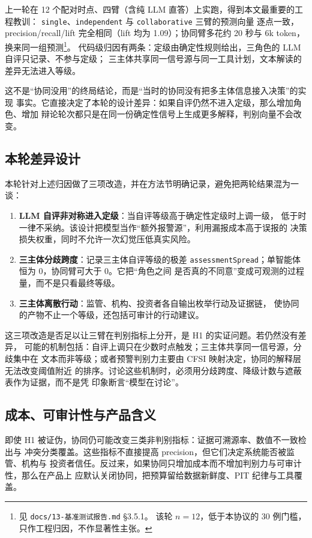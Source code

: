 \documentclass[UTF8,fontset=fandol,11pt,a4paper]{ctexart}
\begin{document}
上一轮在 12 个配对时点、四臂（含纯 LLM 直答）上实跑，得到本文最重要的工程教训：
\texttt{single}、\texttt{independent} 与 \texttt{collaborative} 三臂的预测向量
逐点一致，precision/recall/lift 完全相同（lift 均为 1.09）；协同臂多花约 20 秒与
6k token，换来同一组预测\footnote{见 \texttt{docs/13-基准测试报告.md} §3.5.1。
该轮 $n=12$，低于本协议的 30 例门槛，只作工程归因，不作显著性主张。}。
代码级归因有两条：定级由确定性规则给出，三角色的 LLM 自评只记录、不参与定级；
三主体共享同一信号源与同一工具计划，文本解读的差异无法进入等级。

这不是“协同没用”的终局结论，而是“当时的协同没有把多主体信息接入决策”的实现
事实。它直接决定了本轮的设计差异：如果自评仍然不进入定级，那么增加角色、增加
辩论轮次都只是在同一份确定性信号上生成更多解释，判别向量不会改变。

\subsection{本轮差异设计}

本轮针对上述归因做了三项改造，并在方法节明确记录，避免把两轮结果混为一谈：
\begin{enumerate}
  \item \textbf{LLM 自评非对称进入定级}：当自评等级高于确定性定级时上调一级，
        低于时一律不采纳。该设计把模型当作“额外报警源”，利用漏报成本高于误报的
        决策损失权重，同时不允许一次幻觉压低真实风险。
  \item \textbf{三主体分歧跨度}：记录三主体自评等级的极差
        \texttt{assessmentSpread}；单智能体恒为 0，协同臂可大于 0。它把“角色之间
        是否真的不同意”变成可观测的过程量，而不是只看最终等级。
  \item \textbf{三主体离散行动}：监管、机构、投资者各自输出枚举行动及证据链，
        使协同的产物不止一个等级，还包括可审计的行动建议。
\end{enumerate}
这三项改造是否足以让三臂在判别指标上分开，是 H1 的实证问题。若仍然没有差异，
可能的机制包括：自评上调只在少数时点触发；三主体共享同一信号源，分歧集中在
文本而非等级；或者预警判别力主要由 CFSI 映射决定，协同的解释层无法改变阈值附近
的排序。讨论这些机制时，必须用分歧跨度、降级计数与遮蔽表作为证据，而不是凭
印象断言“模型在讨论”。

\subsection{成本、可审计性与产品含义}

即使 H1 被证伪，协同仍可能改变三类非判别指标：证据可溯源率、数值不一致检出与
冲突分类覆盖。这些指标不直接提高 precision，但它们决定系统能否被监管、机构与
投资者信任。反过来，如果协同只增加成本而不增加判别力与可审计性，那么在产品上
应默认关闭协同，把预算留给数据新鲜度、PIT 纪律与工具覆盖。
\end{document}
